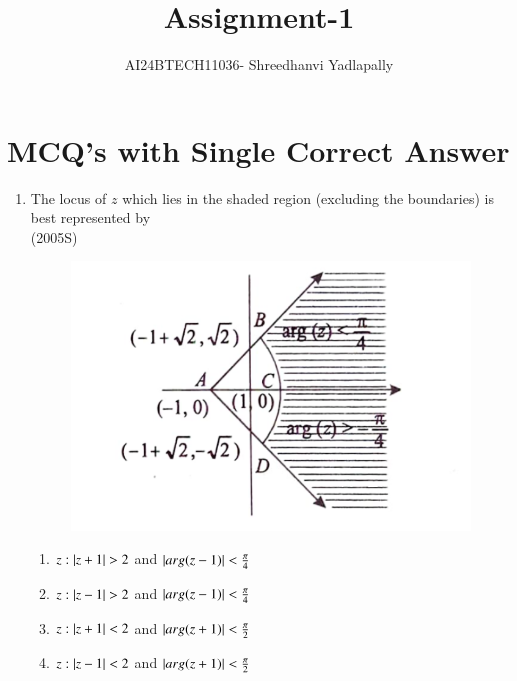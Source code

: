 \documentclass[journal,12pt,twocolumn]{IEEEtran}
\theoremstyle{remark}
\begin{document}

\vspace{3cm}

\title{Assignment-1}
\author{AI24BTECH11036- Shreedhanvi Yadlapally}
\maketitle
\newpage
\bigskip
\section{MCQ's with Single Correct Answer}
\begin{enumerate}
	\item The locus of $z$ which lies in the shaded region (excluding the boundaries) is best represented by
\\

\hfill{(2005S)}\\
		
	        \begin{figure}[ht]
\includegraphics[scale=0.2]{Figure/Screenshot_20240807-085214}
		\end{figure}
	
\begin{enumerate}[label=(\alph*)]
\item $z:\left\vert z+1\right\vert>2$ and  $\left\vert arg(z-1)\right\vert<\frac{\pi}{4}$
\item $z:\left\vert z-1\right\vert>2$ and $\left\vert arg(z-1)\right\vert<\frac{\pi}{4}$
\item $z:\left\vert z+1\right\vert<2$ and $\left\vert arg(z+1)\right\vert<\frac{\pi}{2}$
\item $z:\left\vert z-1\right\vert<2$ and $\left\vert arg(z+1)\right\vert<\frac{\pi}{2}$
\end{enumerate}


\end{enumerate}
\end{document}
